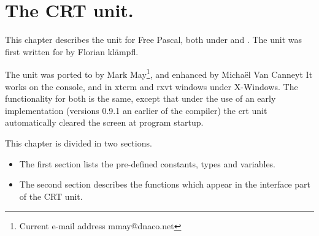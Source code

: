 %
%
%
%
%
\chapter{The CRT unit.}
\label{ch:crtunit}
This chapter describes the  unit for Free Pascal, both under \dos
and \linux. The unit was first written for \dos by Florian kl\"ampfl. 

The unit was ported to \linux by Mark May\footnote{Current
e-mail address \textsf{mmay@dnaco.net}}, and enhanced by Micha\"el Van Canneyt
It works on the \linux console, and in xterm and rxvt windows under
X-Windows. The functionality for both is the same, except that under \linux
the use of an early implementation (versions 0.9.1 an earlier of the
compiler) the crt unit automatically cleared the screen at program startup.

This chapter is divided in two sections. 
\begin{itemize}
\item The first section lists the pre-defined constants, types and variables. 
\item The second section describes the functions which appear in the
interface part of the CRT unit.
\end{itemize}

